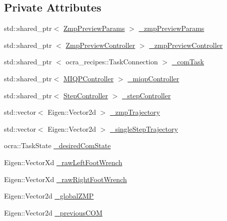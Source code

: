 \subsection*{\-Private \-Attributes}
\begin{DoxyCompactItemize}
\item 
std\-::shared\-\_\-ptr$<$ \hyperlink{structZmpPreviewParams}{\-Zmp\-Preview\-Params} $>$ \hyperlink{classWalkingClient_a9a2cf2d6107ab91fc5bd1d82a3b85a84}{\-\_\-zmp\-Preview\-Params}
\item 
std\-::shared\-\_\-ptr\*
$<$ \hyperlink{classZmpPreviewController}{\-Zmp\-Preview\-Controller} $>$ \hyperlink{classWalkingClient_ae570aa07bed9e336eda93f331f3485fb}{\-\_\-zmp\-Preview\-Controller}
\item 
std\-::shared\-\_\-ptr\*
$<$ ocra\-\_\-recipes\-::\-Task\-Connection $>$ \hyperlink{classWalkingClient_aa798d6193535e80816f8107ee5fb2172}{\-\_\-com\-Task}
\item 
std\-::shared\-\_\-ptr$<$ \hyperlink{classMIQPController}{\-M\-I\-Q\-P\-Controller} $>$ \hyperlink{classWalkingClient_a5dd1abe90bf7182766548c93673af2df}{\-\_\-miqp\-Controller}
\item 
std\-::shared\-\_\-ptr$<$ \hyperlink{classStepController}{\-Step\-Controller} $>$ \hyperlink{classWalkingClient_aff3d76fc360548d6c0c0ea540a0b7509}{\-\_\-step\-Controller}
\item 
std\-::vector$<$ \-Eigen\-::\-Vector2d $>$ \hyperlink{classWalkingClient_a8b8a3d7fe6e12d49a0e72d05f9938564}{\-\_\-zmp\-Trajectory}
\item 
std\-::vector$<$ \-Eigen\-::\-Vector2d $>$ \hyperlink{classWalkingClient_a5d74b737b225cec818922a2b774eed9e}{\-\_\-single\-Step\-Trajectory}
\item 
ocra\-::\-Task\-State \hyperlink{classWalkingClient_a2625bf687aa3141f5a2404c8d9b3c392}{\-\_\-desired\-Com\-State}
\item 
\-Eigen\-::\-Vector\-Xd \hyperlink{classWalkingClient_a1c3fb4d182e33d6d9386e9bb05aa4ae8}{\-\_\-raw\-Left\-Foot\-Wrench}
\item 
\-Eigen\-::\-Vector\-Xd \hyperlink{classWalkingClient_a9df32e0c73632c5f869e5933e20def71}{\-\_\-raw\-Right\-Foot\-Wrench}
\item 
\-Eigen\-::\-Vector2d \hyperlink{classWalkingClient_aa784eac1247f0d858e2364e0c2bc25b2}{\-\_\-global\-Z\-M\-P}
\item 
\-Eigen\-::\-Vector2d \hyperlink{classWalkingClient_a549751e511e023d5fc73eccd1c185317}{\-\_\-previous\-C\-O\-M}
\item 

\end{DoxyCompactItemize}
